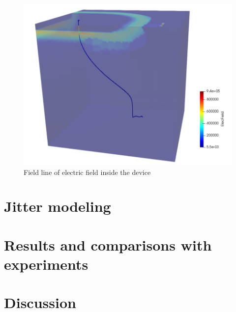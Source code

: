 \documentclass[11pt,a4paper,twocolumn]{article}
\begin{document}
\begin{figure}[h]
\caption{Field line of electric field inside the device}
\centering
\includegraphics[scale=0.4]{../pictures/SL1.png}
\end{figure}

\section{Jitter modeling}

\section{Results and comparisons with experiments}

\section{Discussion}

\newpage
\newpage
\nocite{*}


\end{document}
